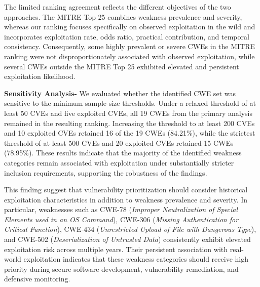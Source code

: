 \documentclass[conference,compsoc]{IEEEtran}
\begin{document}
The limited ranking agreement reflects the different objectives of the two approaches. The MITRE Top 25 combines weakness prevalence and severity, whereas our ranking focuses specifically on observed exploitation in the wild and incorporates exploitation rate, odds ratio, practical contribution, and temporal consistency. Consequently, some highly prevalent or severe CWEs in the MITRE ranking were not disproportionately associated with observed exploitation, while several CWEs outside the MITRE Top 25 exhibited elevated and persistent exploitation likelihood.

\textbf{Sensitivity Analysis-} We evaluated whether the identified CWE set was sensitive to the minimum sample-size thresholds. Under a relaxed threshold of at least 50 CVEs and five exploited CVEs, all 19 CWEs from the primary analysis remained in the resulting ranking. Increasing the threshold to at least 200 CVEs and 10 exploited CVEs retained 16 of the 19 CWEs (84.21\%), while the strictest threshold of at least 500 CVEs and 20 exploited CVEs retained 15 CWEs (78.95\%). These results indicate that the majority of the identified weakness categories remain associated with exploitation under substantially stricter inclusion requirements, supporting the robustness of the findings.

This finding suggest that vulnerability prioritization should consider historical exploitation characteristics in addition to weakness prevalence and severity. In particular, weaknesses such as CWE-78 (\emph{Improper Neutralization of Special Elements used in an OS Command}), CWE-306 (\emph{Missing Authentication for Critical Function}), CWE-434 (\emph{Unrestricted Upload of File with Dangerous Type}), and CWE-502 (\emph{Deserialization of Untrusted Data}) consistently exhibit elevated exploitation risk across multiple years. Their persistent association with real-world exploitation indicates that these weakness categories should receive high priority during secure software development, vulnerability remediation, and defensive monitoring.
\end{document}
